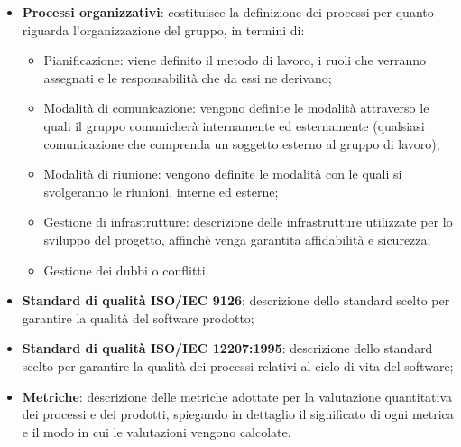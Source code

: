 \begin{itemize}
\begin{itemize}
              \item \textbf{Processi organizzativi}: costituisce la definizione dei processi per quanto riguarda l'organizzazione del gruppo, in termini di:
                    \begin{itemize}
                        \item Pianificazione: viene definito il metodo di lavoro, i ruoli che verranno
                              assegnati e le responsabilità che da essi ne derivano;
                        \item Modalità di comunicazione: vengono definite le modalità attraverso le quali il
                              gruppo comunicherà internamente ed esternamente (qualsiasi comunicazione che
                              comprenda un soggetto esterno al gruppo di lavoro);
                        \item Modalità di riunione: vengono definite le modalità con le quali si svolgeranno
                              le riunioni, interne ed esterne;
                        \item Gestione di infrastrutture: descrizione delle infrastrutture utilizzate per lo
                              sviluppo del progetto, affinchè venga garantita affidabilità e sicurezza;
                        \item Gestione dei dubbi o conflitti.
                    \end{itemize}

              \item \textbf{Standard di qualità ISO/IEC 9126}: descrizione dello standard scelto per garantire la qualità del software prodotto;
              \item \textbf{Standard di qualità ISO/IEC 12207:1995}: descrizione dello standard scelto per garantire la qualità dei processi relativi al ciclo di vita del software;
              \item \textbf{Metriche}: descrizione delle metriche adottate per la valutazione quantitativa dei processi e dei prodotti, spiegando in dettaglio
                    il significato di ogni metrica e il modo in cui le valutazioni vengono calcolate.

          \end{itemize}
\end{itemize}
